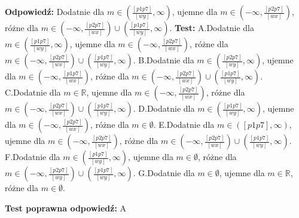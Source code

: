 \documentclass[12pt, a4paper]{article}
\theoremstyle{definition} %
\newcommand{\rozwStop}{\newline}                                            %
\newcommand{\odpStart}{\noindent \textbf{Odpowiedź:}\newline}    %
\newcommand{\odpStop}{\newline}                                             %
\newcommand{\testStart}{\noindent \textbf{Test:}\newline} %
\newcommand{\testStop}{\newline} %
\newcommand{\kluczStart}{\noindent \textbf{Test poprawna odpowiedź:}\newline} %
\newcommand{\kluczStop}{\newline} %
\begin{document}
\rozwStop
\odpStart
Dodatnie dla $m\in\left(\frac{[p1p7]}{[wy]} ,\infty\right)$, ujemne dla $m\in\left(-\infty,\frac{[p2p7]}{[wx]} \right) $, różne dla $m\in\left(-\infty,\frac{[p2p7]}{[wx]} \right) \cup \left(\frac{[p1p7]}{[wy]}  ,\infty\right)$.
\odpStop
\testStart
A.Dodatnie dla $m\in\left(\frac{[p1p7]}{[wy]} ,\infty\right)$, ujemne dla $m\in\left(-\infty,\frac{[p2p7]}{[wx]} \right) $, różne dla $m\in\left(-\infty,\frac{[p2p7]}{[wx]} \right) \cup \left(\frac{[p1p7]}{[wy]}  ,\infty\right)$.
B.Dodatnie dla $m\in\left(\frac{[p2p7]}{[wy]} ,\infty\right)$, ujemne dla $m\in\left(-\infty,\frac{[p1p7]}{[wx]} \right) $, różne dla $m\in\left(-\infty,\frac{[p2p7]}{[wx]} \right) \cup \left(\frac{[p1p7]}{[wy]}  ,\infty\right)$.
C.Dodatnie dla $m\in\mathbb{R}$, ujemne dla $m\in\left(-\infty,\frac{[p2p7]}{[wx]} \right) $, różne dla $m\in\left(-\infty,\frac{[p2p7]}{[wx]} \right) \cup \left(\frac{[p1p7]}{[wy]}  ,\infty\right)$.
D.Dodatnie dla $m\in\left(\frac{[p1p7]}{[wy]} ,\infty\right)$, ujemne dla $m\in\left(-\infty,\frac{[p2p7]}{[wx]} \right) $, różne dla $m\in\emptyset$.
E.Dodatnie dla $m\in\left([p1p7] ,\infty\right)$, ujemne dla $m\in\left(-\infty,\frac{[p2p7]}{[wx]} \right) $, różne dla $m\in\left(-\infty,\frac{[p2p7]}{[wx]} \right) \cup \left(\frac{[p1p7]}{[wy]}  ,\infty\right)$.
F.Dodatnie dla $m\in\left(\frac{[p1p7]}{[wy]} ,\infty\right)$, ujemne dla $m\in\emptyset$, różne dla $m\in\left(-\infty,\frac{[p2p7]}{[wy]} \right) \cup \left(\frac{[p1p7]}{[wy]}  ,\infty\right)$.
G.Dodatnie dla $m\in\emptyset$, ujemne dla $m\in\mathbb{R} $, różne dla $m\in\emptyset$.

\testStop
\kluczStart
A
\kluczStop
\end{document}
